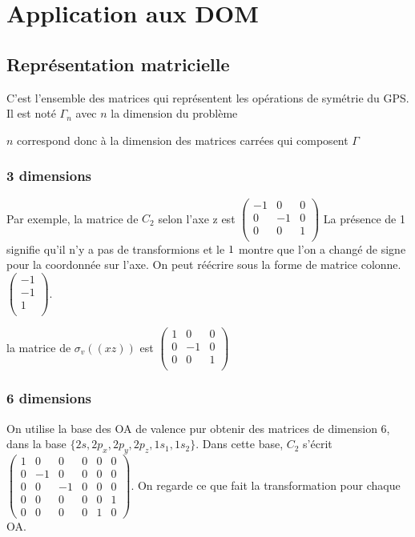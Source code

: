 \documentclass[french]{yLectureNote}
\begin{document}
\section{Application aux DOM}
\subsection{Représentation matricielle}
\begin{definition}
C'est l'ensemble des matrices qui représentent les opérations de symétrie du GPS. Il est noté \(\Gamma_n\) avec \(n\) la dimension du problème
\end{definition}
\(n\) correspond donc à la dimension des matrices carrées qui composent \(\Gamma\)
\subsubsection{3 dimensions}
Par exemple, la matrice de \(C_2\) selon l'axe z est \( \begin{pmatrix}
-1 & 0 & 0 \\
0 & -1 & 0 \\
0 & 0 & 1 \\
\end{pmatrix}\)
La présence de 1 signifie qu'il n'y a pas de transformions et le \(\-1\) montre que l'on a changé de signe pour la coordonnée sur l'axe. On peut réécrire sous la forme de matrice colonne.
\( \begin{pmatrix}
-1 \\
-1 \\
1 \\
\end{pmatrix}\).

la matrice de \(\sigma_v((xz))\) est \( \begin{pmatrix}
1 & 0 & 0 \\
0 & -1 & 0 \\
0 & 0 & 1 \\
\end{pmatrix}\)
\subsubsection{6 dimensions}
On utilise la base des OA de valence pur obtenir des matrices de dimension 6, dans la base \(\{2s,2p_x,2p_y,2p_z,1s_1,1s_2\}\). Dans cette base, \(C_2\) s'écrit  \( \begin{pmatrix}
1 & 0 & 0 &0&0&0 \\
0 & -1 & 0&0&0&0 \\
0 & 0 &- 1 &0&0&0\\
0&0&0&0&0&1\\
0&0&0&0&1&0
\end{pmatrix}\).
On regarde ce que fait la transformation pour chaque OA.
\end{document}
